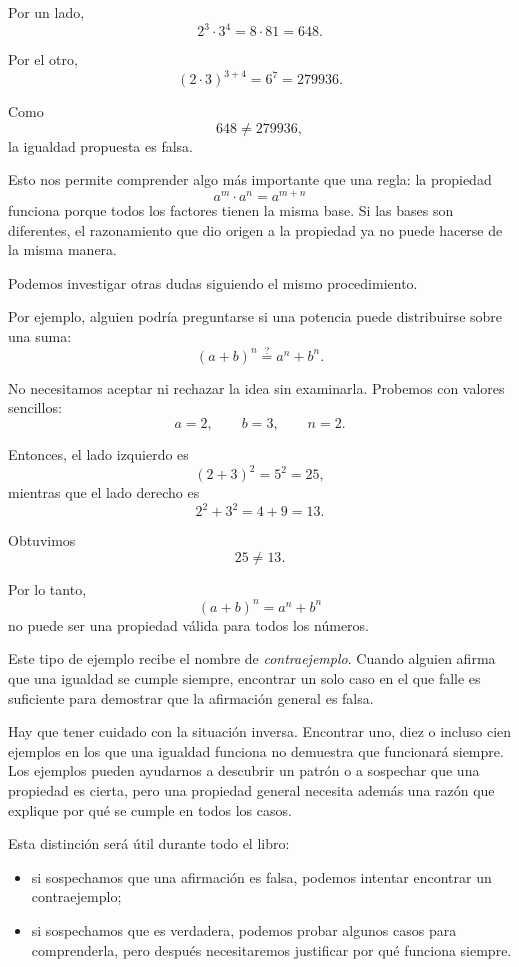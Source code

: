 Por un lado,
\[
2^3\cdot3^4
=
8\cdot81
=
648.
\]

Por el otro,
\[
(2\cdot3)^{3+4}
=
6^7
=
279936.
\]

Como
\[
648\ne279936,
\]
la igualdad propuesta es falsa.

Esto nos permite comprender algo más importante que una regla: la propiedad
\[
a^m\cdot a^n=a^{m+n}
\]
funciona porque todos los factores tienen la misma base. Si las bases son diferentes, el razonamiento que dio origen a la propiedad ya no puede hacerse de la misma manera.

Podemos investigar otras dudas siguiendo el mismo procedimiento.

Por ejemplo, alguien podría preguntarse si una potencia puede distribuirse sobre una suma:
\[
(a+b)^n
\stackrel{?}{=}
a^n+b^n.
\]

No necesitamos aceptar ni rechazar la idea sin examinarla. Probemos con valores sencillos:
\[
a=2,\qquad b=3,\qquad n=2.
\]

Entonces, el lado izquierdo es
\[
(2+3)^2
=
5^2
=
25,
\]
mientras que el lado derecho es
\[
2^2+3^2
=
4+9
=
13.
\]

Obtuvimos
\[
25\ne13.
\]

Por lo tanto,
\[
(a+b)^n=a^n+b^n
\]
no puede ser una propiedad válida para todos los números.

Este tipo de ejemplo recibe el nombre de \emph{contraejemplo}. Cuando alguien afirma que una igualdad se cumple siempre, encontrar un solo caso en el que falle es suficiente para demostrar que la afirmación general es falsa.

Hay que tener cuidado con la situación inversa. Encontrar uno, diez o incluso cien ejemplos en los que una igualdad funciona no demuestra que funcionará siempre. Los ejemplos pueden ayudarnos a descubrir un patrón o a sospechar que una propiedad es cierta, pero una propiedad general necesita además una razón que explique por qué se cumple en todos los casos.

Esta distinción será útil durante todo el libro:

\begin{itemize}
    \item si sospechamos que una afirmación es falsa, podemos intentar encontrar un contraejemplo;
    \item si sospechamos que es verdadera, podemos probar algunos casos para comprenderla, pero después necesitaremos justificar por qué funciona siempre.
\end{itemize}

